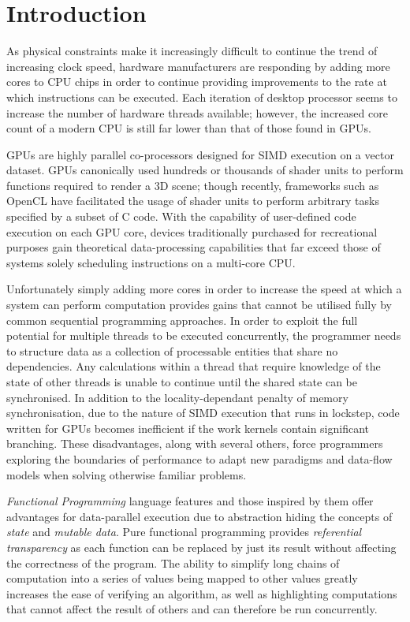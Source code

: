 \section{Introduction}
  As physical constraints make it increasingly difficult to continue the trend of increasing clock speed, hardware manufacturers are responding by adding more cores to \ac{CPU} chips in order to continue providing improvements to the rate at which instructions can be executed.
  Each iteration of desktop processor seems to increase the number of hardware threads available; however, the increased core count of a modern \ac{CPU} is still far lower than that of those found in \ac{GPUs}.

\ac{GPUs} are highly parallel co-processors designed for \ac{SIMD} execution on a vector dataset.
\ac{GPUs} canonically used hundreds or thousands of shader units to perform functions required to render a 3D scene; though recently, frameworks such as \ac{OpenCL} have facilitated the usage of shader units to perform arbitrary tasks specified by a subset of C code.
 With the capability of user-defined code execution on each GPU core, devices traditionally purchased for recreational purposes gain theoretical data-processing capabilities that far exceed those of systems solely scheduling instructions on a multi-core \ac{CPU}.

Unfortunately simply adding more cores in order to increase the speed at which a system can perform computation provides gains that cannot be utilised fully by common sequential programming approaches.
In order to exploit the full potential for multiple threads to be executed concurrently, the programmer needs to structure data as a collection of processable entities that share no dependencies.
Any calculations within a thread that require knowledge of the state of other threads is unable to continue until the shared state can be synchronised.
In addition to the locality-dependant penalty of memory synchronisation, due to the nature of \ac{SIMD} execution that runs in lockstep, code written for \ac{GPUs} becomes inefficient if the work kernels contain significant branching.
These disadvantages, along with several others, force programmers exploring the boundaries of performance to adapt new paradigms and data-flow models when solving otherwise familiar problems.


\emph{Functional Programming} language features and those inspired by them offer advantages for data-parallel execution due to abstraction hiding the concepts of \emph{state} and \emph{mutable data}.
Pure functional programming provides \emph{referential transparency} as each function can be replaced by just its result without affecting the correctness of the program.
The ability to simplify long chains of computation into a series of values being mapped to other values greatly increases the ease of verifying an algorithm, as well as highlighting computations that cannot affect the result of others and can therefore be run concurrently.

